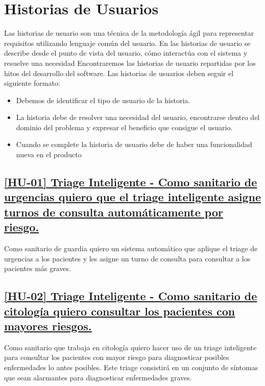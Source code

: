\section{Historias de Usuarios}
Las historias de usuario son una técnica de la metodología ágil para representar requisitos utilizando lenguaje común del usuario.
En las historias de usuario se describe desde el punto de vista del usuario, cómo interactúa con el sistema y resuelve una necesidad
Encontraremos las historias de usuario repartidas por los hitos del desarrollo del software. Las historias de usuarios deben seguir el siguiente formato:

\begin{itemize}
    \item{Debemos de identificar el tipo de usuario de la historia.}
    \item{La historia debe de resolver una necesidad del usuario, encontrarse dentro del dominio del problema y expresar el beneficio que consigue el usuario.}
    \item{Cuando se complete la historia de usuario debe de haber una funcionalidad nueva en el producto}
\end{itemize}


\subsection*{\href{https://github.com/RubenDelgadoPareja/TFG-Triage-Inteligente-Consulta-Medica/issues/19}{[HU-01] Triage Inteligente - Como sanitario de urgencias quiero que el triage inteligente asigne turnos de consulta automáticamente por riesgo.}}
Como sanitario de guardia quiero un sistema automático que aplique el triage de urgencias a los pacientes y les asigne un turno de consulta para consultar a los pacientes más graves.

\subsection*{\href{https://github.com/RubenDelgadoPareja/TFG-Triage-Inteligente-Consulta-Medica/issues/101}{[HU-02] Triage Inteligente - Como sanitario de citología quiero consultar los pacientes con mayores riesgos.}}
Como sanitario que trabaja en citología quiero hacer uso de un triage inteligente para consultar los pacientes con mayor riesgo para diagnosticar posibles enfermedades lo antes posibles.
Este triage consistirá en un conjunto de síntomas que sean alarmantes para diagnosticar enfermedades graves.

